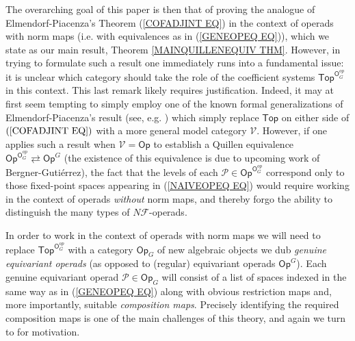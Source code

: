 \documentclass[a4paper,10pt]{article}%
\begin{document}
The overarching goal of this paper is then that of proving the analogue of Elmendorf-Piacenza's Theorem (\ref{COFADJINT EQ})
in the context of operads with norm maps (i.e. with equivalences as in (\ref{GENEOPEQ EQ})),
which we state as our main result, Theorem \ref{MAINQUILLENEQUIV THM}.
However, in trying to formulate such a result one immediately runs into a fundamental issue: 
it is unclear which category should take the role of the coefficient systems $\mathsf{Top}^{\mathsf{O}_G^{op}}$ in this context.
This last remark likely requires justification. 
Indeed, it may at first seem tempting to simply 
employ one of the known formal generalizations of Elmendorf-Piacenza's result (see, e.g. \cite[Thm. 3.17]{Ste16}) which simply replace
$\mathsf{Top}$ on either side of $(\ref{COFADJINT EQ})$
with a more general model category $\mathcal{V}$.
However, if one applies such a result when 
$\mathcal{V}=\mathsf{Op}$
to establish a Quillen equivalence
$\mathsf{Op}^{\mathsf{O}_G^{op}}
\rightleftarrows
\mathsf{Op}^G$
(the existence of this equivalence is due to
upcoming work of Bergner-Guti\'{e}rrez), 
the fact that 
the levels of each 
$\mathcal{P} \in \mathsf{Op}^{\mathsf{O}_G^{op}}$
correspond only to those fixed-point spaces appearing in (\ref{NAIVEOPEQ EQ})
would require working in the context of operads \textit{without} norm maps,
and thereby forgo the ability to distinguish 
the many types of $N \mathcal{F}$-operads.


In order to work in the context of operads with norm maps we will need to replace 
$\mathsf{Top}^{\mathsf{O}_G^{op}}$
with a category
$\mathsf{Op}_G$
of new algebraic objects we dub 
\textit{genuine equivariant operads}
(as opposed to (regular) equivariant operads
$\mathsf{Op}^G$).
Each genuine equivariant operad 
$\mathcal{P} \in \mathsf{Op}_G$
will consist of a list of spaces indexed
in the same way as in 
(\ref{GENEOPEQ EQ}) along with obvious restriction maps and, more importantly, 
suitable \textit{composition maps}. Precisely identifying the required composition maps is one of the main challenges of this theory, and again we turn to \cite{BH15} for motivation.
\end{document}
